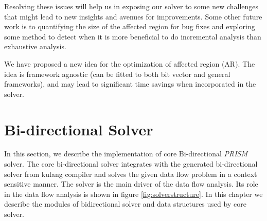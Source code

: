 \documentclass[11pt,a4paper,openright]{report}
\begin{document}
Resolving these issues will help us in exposing our solver to some new challenges that might lead to new insights and avenues for improvements.
Some other future work is to quantifying the size of the affected region for bug fixes and exploring some method to detect when it is more beneficial
to do incremental analysis than exhaustive analysis.


We have proposed a new idea for the optimization of affected region (AR). The idea is framework agnostic
(can be fitted to both bit vector and general frameworks), and may lead to significant time savings when
incorporated in the solver.


\renewcommand{\bibname}{References}
\begin{small}


\end{small}

\appendix
\chapter{Bi-directional Solver}\label{ap:BidirectionalSolver}
In this section, we describe the implementation of core Bi-directional \emph{PRISM} solver. The core bi-directional solver 
integrates with the generated bi-directional solver from kulang compiler and solves the given data flow problem in a context
sensitive manner. The solver is the main driver of the data flow analysis. Its role in the data flow analysis is shown in 
figure \ref{fig:solverstructure}. In this chapter we describe the modules of bidirectional solver and data structures used 
by core solver.
\end{document}
